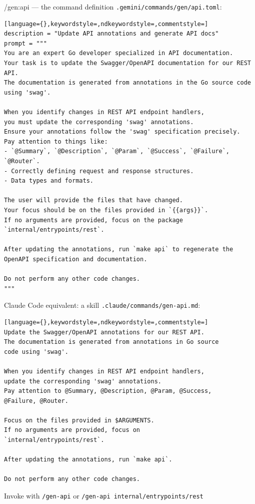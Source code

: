 \documentclass[aspectratio=169,11pt]{beamer}
\begin{document}
\begin{frame}[fragile]{/gen:api --- the command definition}
  \texttt{.gemini/commands/gen/api.toml}:

  \vspace{4pt}
\begin{lstlisting}[language={},keywordstyle=,ndkeywordstyle=,commentstyle=]
description = "Update API annotations and generate API docs"
prompt = """
You are an expert Go developer specialized in API documentation.
Your task is to update the Swagger/OpenAPI documentation for our REST API.
The documentation is generated from annotations in the Go source code using 'swag'.

When you identify changes in REST API endpoint handlers,
you must update the corresponding 'swag' annotations.
Ensure your annotations follow the 'swag' specification precisely.
Pay attention to things like:
- `@Summary`, `@Description`, `@Param`, `@Success`, `@Failure`, `@Router`.
- Correctly defining request and response structures.
- Data types and formats.

The user will provide the files that have changed.
Your focus should be on the files provided in `{{args}}`.
If no arguments are provided, focus on the package `internal/entrypoints/rest`.

After updating the annotations, run `make api` to regenerate the OpenAPI specification and documentation.

Do not perform any other code changes.
"""
\end{lstlisting}
\end{frame}

\begin{frame}[fragile]{Claude Code equivalent: a skill}
  \texttt{.claude/commands/gen-api.md}:

  \vspace{4pt}
\begin{lstlisting}[language={},keywordstyle=,ndkeywordstyle=,commentstyle=]
Update the Swagger/OpenAPI annotations for our REST API.
The documentation is generated from annotations in Go source
code using 'swag'.

When you identify changes in REST API endpoint handlers,
update the corresponding 'swag' annotations.
Pay attention to @Summary, @Description, @Param, @Success,
@Failure, @Router.

Focus on the files provided in $ARGUMENTS.
If no arguments are provided, focus on
`internal/entrypoints/rest`.

After updating the annotations, run `make api`.

Do not perform any other code changes.
\end{lstlisting}

  \vspace{4pt}
  {\small Invoke with \texttt{/gen-api} or \texttt{/gen-api internal/entrypoints/rest}}
\end{frame}
\end{document}
